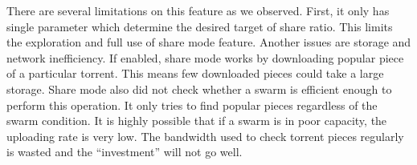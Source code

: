 There are several limitations on this feature as we observed. First, it only has single parameter which determine the desired target of share ratio. This limits the exploration and full use of share mode feature. Another issues are storage and network inefficiency. If enabled, share mode works by downloading popular piece of a particular torrent. This means few downloaded pieces could take a large storage. Share mode also did not check whether a swarm is efficient enough to perform this operation. It only tries to find popular pieces regardless of the swarm condition. It is highly possible that if a swarm is in poor capacity, the uploading rate is very low. The bandwidth used to check torrent pieces regularly is wasted and the ``investment'' will not go well.